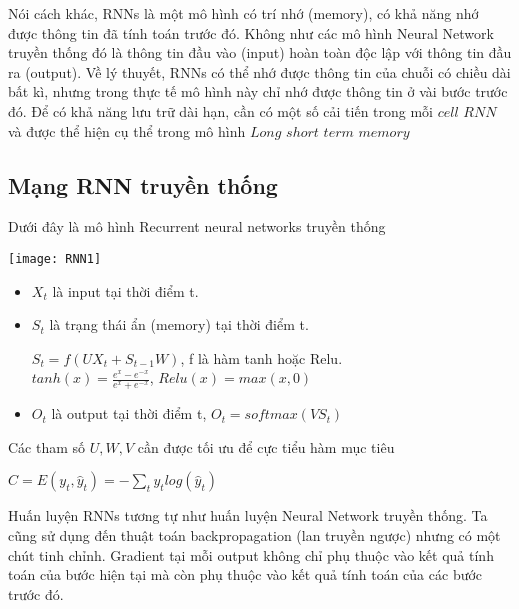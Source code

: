 Nói cách khác, RNNs là một mô hình có trí nhớ (memory), có khả năng nhớ được thông tin đã tính toán trước đó. Không như các mô hình Neural Network truyền thống đó là thông tin đầu vào (input) hoàn toàn độc lập với thông tin đầu ra (output). Về lý thuyết, RNNs có thể nhớ được thông tin của chuỗi có chiều dài bất kì, nhưng trong thực tế mô hình này chỉ nhớ được thông tin ở vài bước trước đó. Để có khả năng lưu trữ dài hạn, cần có một số cải tiến trong mỗi $cell$ $RNN$ và được thể hiện cụ thể trong mô hình $Long$ $short$ $term$ $memory$
	 
\subsection{Mạng RNN truyền thống}
	Dưới đây là mô hình Recurrent neural networks truyền thống
	\begin{center}
	  \texttt{[image: RNN1]}
	  \label{RNNS1}
	\end{center}
	\begin{itemize}[label = \textbullet]
		\item $X_{t}$ là input tại thời điểm t.
		\item $S_{t}$ là trạng thái ẩn (memory) tại thời điểm t.
		\begin{center}
			$S_{t} = f(UX_{t} + S_{t-1}W)$, f là hàm tanh hoặc Relu.\\
			$tanh(x) = \frac{e^{x} - e^{-x}}{e^{x} + e^{-x}}$, $Relu(x) = max(x, 0)$
		\end{center}
		\item $O_{t}$ là output tại thời điểm t, $O_{t} = softmax(VS_{t})$
	\end{itemize}
Các tham số $U, W, V$ cần được tối ưu để cực tiểu hàm mục tiêu
	\begin{center}
			$C = E(y_{t}, \hat{y}_{t}) = - \sum\limits_{t}{y_{t}log(\hat{y}_{t})}$
	\end{center}
Huấn luyện RNNs tương tự như huấn luyện Neural Network truyền thống. Ta cũng sử dụng đến thuật toán backpropagation (lan truyền ngược) nhưng có một chút tinh chỉnh. Gradient tại mỗi output không chỉ phụ thuộc vào kết quả tính toán của bước hiện tại mà còn phụ thuộc vào kết quả tính toán của các bước trước đó. 

